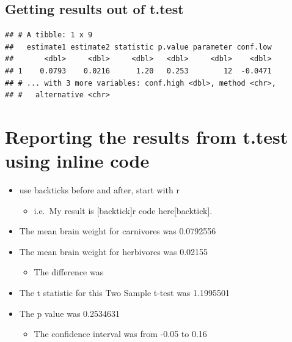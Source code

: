 \documentclass[
]{book}
\newenvironment{Shaded}{\begin{snugshade}}{\end{snugshade}}
\newcommand{\DataTypeTok}[1]{\textcolor[rgb]{0.13,0.29,0.53}{#1}}
\newcommand{\KeywordTok}[1]{\textcolor[rgb]{0.13,0.29,0.53}{\textbf{#1}}}
\newcommand{\NormalTok}[1]{#1}
\newcommand{\OperatorTok}[1]{\textcolor[rgb]{0.81,0.36,0.00}{\textbf{#1}}}
\newcommand{\StringTok}[1]{\textcolor[rgb]{0.31,0.60,0.02}{#1}}
\providecommand{\tightlist}{%
  \setlength{\itemsep}{0pt}\setlength{\parskip}{0pt}}
\begin{document}
\begin{Shaded}
\end{Shaded}

\hypertarget{getting-results-out-of-t.test-1}{%
\subsection{Getting results out of t.test}\label{getting-results-out-of-t.test-1}}

\begin{verbatim}
## # A tibble: 1 x 9
##   estimate1 estimate2 statistic p.value parameter conf.low
##       <dbl>     <dbl>     <dbl>   <dbl>     <dbl>    <dbl>
## 1    0.0793    0.0216      1.20   0.253        12  -0.0471
## # ... with 3 more variables: conf.high <dbl>, method <chr>,
## #   alternative <chr>
\end{verbatim}

\hypertarget{reporting-the-results-from-t.test-using-inline-code}{%
\section{Reporting the results from t.test using inline code}\label{reporting-the-results-from-t.test-using-inline-code}}

\begin{itemize}
\tightlist
\item
  use backticks before and after, start with r

  \begin{itemize}
  \tightlist
  \item
    i.e.~My result is {[}backtick{]}r code here{[}backtick{]}.
  \end{itemize}
\item
  The mean brain weight for carnivores was 0.0792556
\item
  The mean brain weight for herbivores was 0.02155

  \begin{itemize}
  \tightlist
  \item
    The difference was
  \end{itemize}
\item
  The t statistic for this Two Sample t-test was 1.1995501
\item
  The p value was 0.2534631

  \begin{itemize}
  \tightlist
  \item
    The confidence interval was from -0.05 to 0.16
  \end{itemize}
\end{itemize}
\end{document}
